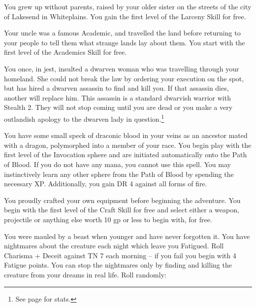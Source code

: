 \begin{multicols}{2}
\begin{list}{\addtocounter{list}{1}\textbf{:}}{\raggedleft}
\item{You grew up without parents, raised by your older sister on the streets of the city of Lakesend in Whiteplains.
You gain the first level of the Larceny Skill for free.}

\item{Your uncle was a famous Academic, and travelled the land before returning to your people to tell them what strange lands lay about them.  You start with the first level of the Academics Skill for free.}

\item{You once, in jest, insulted a dwarven woman who was travelling through your homeland.  She could not break the law by ordering your execution on the spot, but has hired a dwarven assassin to find and kill you.  If that assassin dies, another will replace him.  This assassin is a standard dwarvish warrior with Stealth 2.  They will not stop coming until you are dead or you make a very outlandish apology to the dwarven lady in question.\footnote{See page \pageref{dwarven_soldier} for stats.}}

\item{You have some small speck of draconic blood in your veins as an ancestor mated with a dragon, polymorphed into a member of your race.  You begin play with the first level of the Invocation sphere and are initiated automatically onto the Path of Blood.  If you do not have any mana, you cannot use this spell.  You may instinctively learn any other sphere from the Path of Blood by spending the necessary XP.  Additionally, you gain DR 4 against all forms of fire.}

\item{You proudly crafted your own equipment before beginning the adventure.  You begin with the first level of the Craft Skill for free and select either a weapon, projectile or anything else worth 10 gp or less to begin with, for free.}

\item{You were mauled by a beast when younger and have never forgotten it. You have nightmares about the creature each night which leave you Fatigued.  Roll Charisma + Deceit against TN 7 each morning -- if you fail you begin with 4 Fatigue points.  You can stop the nightmares only by finding and killing the creature from your dreams in real life.  Roll randomly:}

	\setcounter{enc}{6}

	\begin{list}{\addtocounter{enc}{-1}}{}


\end{list}
\end{list}
\end{multicols}
